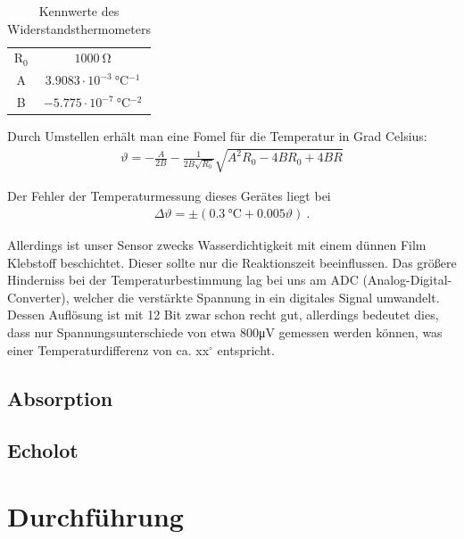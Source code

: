 \documentclass[12pt,a4paper,titlepage,headinclude,bibtotoc]{scrartcl}
\begin{document}
\begin{table}[!htb]
	\centering
	\begin{tabular}{|c|c|}
		\hline
		R$_0$ & $1000 ~ \si{\ohm}$\\
		A   & $3.9083 \cdot 10^{-3} ~ \si{\celsius^{-1}}$\\
		B   & $-5.775 \cdot 10^{-7} ~ \si{\celsius^{-2}}$\\
		\hline
	\end{tabular}
	\caption{Kennwerte des Widerstandsthermometers}
	\label{tab:Pt1000}
\end{table}

Durch Umstellen erhält man eine Fomel für die Temperatur in Grad Celsius:
\begin{align}
 \vartheta = -\frac{A}{2 B} - \frac{1}{2 B \sqrt{R_0}} \sqrt{A^2 R_0  - 4 B R_0 + 4 B R    } 
\end{align}




Der Fehler der Temperaturmessung dieses Gerätes liegt bei
\begin{align}
	\Delta\vartheta=\pm (0.3~\si{\celsius}+0.005\vartheta)~.
	\label{eq:Pt1000_fehler}
\end{align}

Allerdings ist unser Sensor zwecks Wasserdichtigkeit mit einem dünnen Film Klebstoff beschichtet.
Dieser sollte nur die Reaktionszeit beeinflussen.
Das größere Hinderniss bei der Temperaturbestimmung lag bei uns am ADC (Analog-Digital-Converter), welcher die verstärkte Spannung in ein digitales Signal umwandelt.
Dessen Auflösung ist mit 12 Bit zwar schon recht gut, allerdings bedeutet dies, dass nur Spannungsunterschiede von etwa 800\si{\micro\volt} gemessen werden können, was einer Temperaturdifferenz von ca. xx$^\circ$ entspricht.


\subsection{Absorption}

\subsection{Echolot}
                                                                                                                                                                      
\section{Durchführung}
\label{sec:durchfuehrung}
\end{document}
